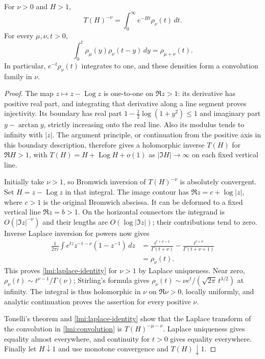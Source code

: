 \begin{theorem}\label{lmi:laplace}
For $\nu>0$ and $H>1$,
\begin{equation}\label{lmi:laplace-identity}
 T(H)^{-\nu}=\int_0^\infty e^{-Ht}\rho_\nu(t)\,dt .
\end{equation}
For every $\mu,\nu,t>0$,
\begin{equation}\label{lmi:convolution}
 \int_0^t\rho_\mu(y)\rho_\nu(t-y)\,dy=\rho_{\mu+\nu}(t).
\end{equation}
In particular, $e^{-t}\rho_\nu(t)$ integrates to one, and these
densities form a convolution family in $\nu$.
\end{theorem}
\begin{proof}
The map $z\mapsto z-\operatorname{Log}z$ is one-to-one on $\Re z>1$:
its derivative has positive real part, and integrating that derivative
along a line segment proves injectivity. Its boundary has real part
$1-\tfrac12\log(1+y^2)\le1$ and imaginary part $y-\arctan y$,
strictly increasing onto the real line. Also its modulus tends to
infinity with $|z|$. The argument principle, or continuation from the
positive axis in this boundary description, therefore gives a
holomorphic inverse $T(H)$ for $\Re H>1$, with
$T(H)=H+\operatorname{Log}H+o(1)$ as $|\Im H|\to\infty$
on each fixed vertical line.

Initially take $\nu>1$, so Bromwich inversion of $T(H)^{-\nu}$
is absolutely convergent. Set $H=z-\operatorname{Log}z$ in that
integral. The image contour has
$\Re z=c+\log|z|$, where $c>1$ is the original Bromwich abscissa.
It can be deformed to a fixed vertical line $\Re z=b>1$.
On the horizontal connectors the integrand is
$O(|\Im z|^{-\nu})$ and their lengths are $O(\log|\Im z|)$;
their contributions tend to zero. Inverse Laplace inversion for
powers now gives
\begin{align*}
 \frac1{2\pi i}\int e^{tz}z^{-t-\nu}(1-z^{-1})\,dz
 &=\frac{t^{t+\nu-1}}{\Gamma(t+\nu)}
   -\frac{t^{t+\nu}}{\Gamma(t+\nu+1)}\\
 &=\rho_\nu(t).
\end{align*}
This proves \eqref{lmi:laplace-identity} for $\nu>1$ by Laplace
uniqueness. Near zero, $\rho_\nu(t)\sim t^{\nu-1}/\Gamma(\nu)$;
Stirling's formula gives $\rho_\nu(t)\sim\nu e^t/
(\sqrt{2\pi}\,t^{3/2})$ at infinity. The integral is thus holomorphic
in $\nu$ on $\Re\nu>0$, locally uniformly, and analytic continuation
proves the assertion for every positive $\nu$.

Tonelli's theorem and \eqref{lmi:laplace-identity} show that the
Laplace transform of the convolution in \eqref{lmi:convolution}
is $T(H)^{-\mu-\nu}$. Laplace uniqueness gives equality almost
everywhere, and continuity for $t>0$ gives equality everywhere.
Finally let $H\downarrow1$ and use monotone convergence and $T(H)\downarrow1$.
\end{proof}


